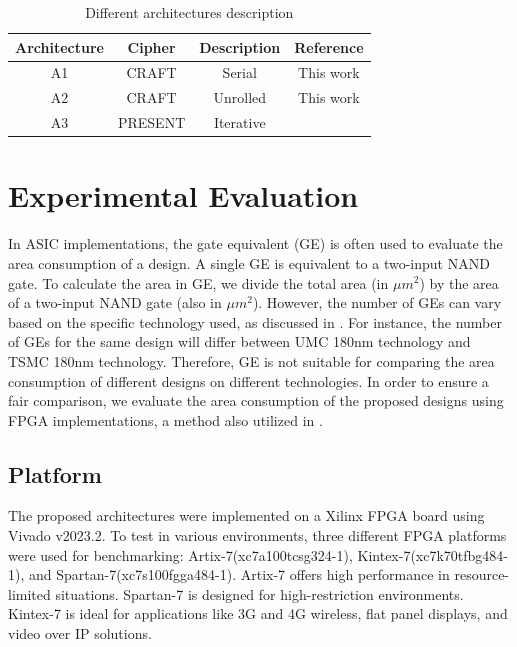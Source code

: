 \documentclass[final,5p,times,twocolumn]{elsarticle}
\begin{document}
\begin{table}[h]
    \centering
    \caption{Different architectures description}\label{tab2}%
    \begin{tabular}{|c|c|c|c|}
        \hline
        Architecture & Cipher  & Description & Reference                \\
        \hline
        A1           & CRAFT   & Serial      & This work                \\
        A2           & CRAFT   & Unrolled    & This work                \\
        A3           & PRESENT & Iterative   & \cite{bharathi2022light} \\
        \hline
    \end{tabular}
\end{table}


\section{Experimental Evaluation}\label{sec4}

In ASIC implementations, the gate equivalent (GE) is often used to evaluate the area consumption of a design.
A single GE is equivalent to a two-input NAND gate.
To calculate the area in GE, we divide the total area (in $\mu m^2$) by the area of a two-input NAND gate (also in $\mu m^2$).
However, the number of GEs can vary based on the specific technology used, as discussed in \cite{Turan}.
For instance, the number of GEs for the same design will differ between UMC 180nm technology and TSMC 180nm technology.
Therefore, GE is not suitable for comparing the area consumption of different designs on different technologies.
In order to ensure a fair comparison, we evaluate the area consumption of the proposed designs using FPGA implementations, a method also utilized in \cite{Mohajerani2020}.

\subsection{Platform}\label{subsec4}

The proposed architectures were implemented on a Xilinx FPGA board using Vivado v2023.2. To test in various environments, three different FPGA platforms were used for benchmarking: Artix-7(xc7a100tcsg324-1), Kintex-7(xc7k70tfbg484-1), and Spartan-7(xc7s100fgga484-1).
Artix-7 offers high performance in resource-limited situations. Spartan-7 is designed for high-restriction environments. Kintex-7 is ideal for applications like 3G and 4G wireless, flat panel displays, and video over IP solutions.
\end{document}
